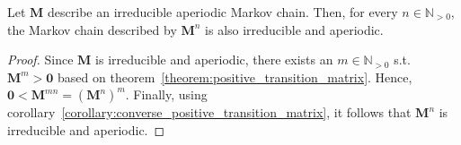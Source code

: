 \documentclass[../../main.tex]{subfiles}
\begin{document}
    \begin{lemma}
        \label{lemma:irreducible_aperiodic_markov_chain_stays_irreducible_aperiodic}
        Let $\bm{M}$ describe an irreducible aperiodic Markov chain. Then, for every $n \in \mathbb{N}_{>0}$, the Markov chain described by $\bm{M}^n$ is also irreducible and aperiodic.
    \end{lemma}
    \vspace{-2.5em}
    \begin{proof}
        Since $\bm{M}$ is irreducible and aperiodic, there exists an $m \in \mathbb{N}_{>0}$ s.t. $\bm{M}^m > \bm{0}$ based on theorem~\ref{theorem:positive_transition_matrix}. Hence, $\bm{0} < \bm{M}^{mn} = (\bm{M}^n)^m$. Finally, using corollary~\ref{corollary:converse_positive_transition_matrix}, it follows that $\bm{M}^n$ is irreducible and aperiodic.
    \end{proof}
\end{document}
